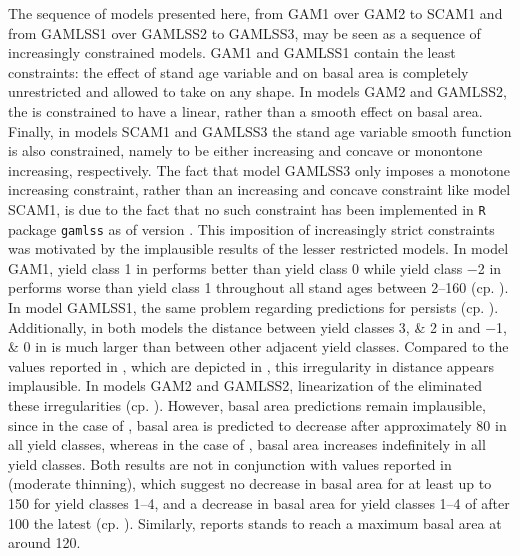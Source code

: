 The sequence of models presented here, from GAM1 over GAM2 to SCAM1 and from GAMLSS1 over GAMLSS2 to GAMLSS3, may be seen as a sequence of increasingly constrained models.  GAM1 and GAMLSS1 contain the least constraints:  the effect of stand age variable and \ProductivityIndexVariableText{} on basal area is completely unrestricted and allowed to take on any shape.  In models GAM2 and GAMLSS2, the \ProductivityIndexVariableText{} is constrained to have a linear, rather than a smooth effect on basal area.  Finally, in models SCAM1 and GAMLSS3 the stand age variable smooth function is also constrained, namely to be either increasing and concave or monontone increasing, respectively.  The fact that model GAMLSS3 only imposes a monotone increasing constraint, rather than an increasing and concave constraint like model SCAM1, is due to the fact that no such constraint has been implemented in \texttt{R} package \texttt{gamlss} as of version \gamlssPackageVersion{}.
This imposition of increasingly strict constraints was motivated by the implausible results of the lesser restricted models.
In model GAM1, yield class \num{1} in \Beech{} performs better than yield class \num{0} while
yield class \num{-2} in \Spruce{} performs worse than yield class \num{1} throughout all stand ages between \SIrange{2}{160}{\year} (cp. ).
In model GAMLSS1, the same problem regarding predictions for \Beech{} persists (cp. ).  Additionally, in both models the distance between yield classes \numlist{3;2} in \Beech{} and \numlist{-1;0} in \Spruce{} is much larger than between other adjacent yield classes.  Compared to the values reported in \textcite{Schober1995}, which are depicted in , this irregularity in distance appears implausible.
In models GAM2 and GAMLSS2, linearization of the \ProductivityIndexVariableText{} eliminated these irregularities (cp. ).  However, basal area predictions remain implausible, since in the case of \Beech{}, basal area is predicted to decrease after approximately \SI{80}{\year} in all yield classes, whereas in the case of \Spruce{}, basal area increases indefinitely in all yield classes.  Both results are not in conjunction with values reported in \textcite{Schober1995} (moderate thinning), which suggest no decrease in basal area for \Beech{} at least up to \SI{150}{\year} for yield classes \numrange{1}{4}, and a decrease in basal area for yield classes \numrange{1}{4} of \Spruce{} after \SI{100}{\year} the latest (cp. ).  Similarly, \textcite{Franz1965} reports \Spruce{} stands to reach a maximum basal area at around \SI{120}{\year}.
